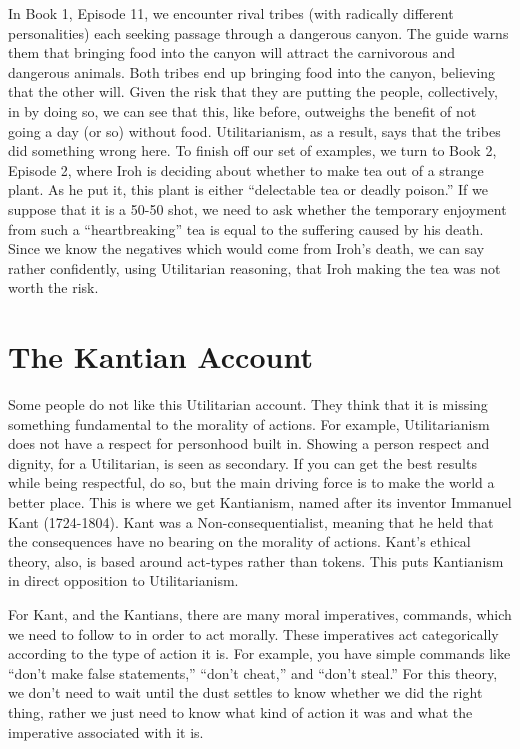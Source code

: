 In Book 1, Episode 11, we encounter rival tribes (with radically different personalities) each seeking passage through a dangerous canyon.\autocite[00:00-23:37]{Divide1} The guide warns them that bringing food into the canyon will attract the carnivorous and dangerous animals. Both tribes end up bringing food into the canyon, believing that the other will. Given the risk that they are putting the people, collectively, in by doing so, we can see that this, like before, outweighs the benefit of not going a day (or so) without food. Utilitarianism, as a result, says that the tribes did something wrong here.  To finish off our set of examples, we turn to Book 2, Episode 2, where Iroh is deciding about whether to make tea out of a strange plant.\autocite[03:14-03:53, 06:11-07:06]{Lovers1} As he put it, this plant is either “delectable tea or deadly poison.” If we suppose that it is a 50-50 shot, we need to ask whether the temporary enjoyment from such a “heartbreaking” tea is equal to the suffering caused by his death. Since we know the negatives which would come from Iroh’s death, we can say rather confidently, using Utilitarian reasoning, that Iroh making the tea was not worth the risk.

\section{The Kantian Account}

Some people do not like this Utilitarian account. They think that it is missing something fundamental to the morality of actions. For example, Utilitarianism does not have a respect for personhood built in. Showing a person respect and dignity, for a Utilitarian, is seen as secondary. If you can get the best results while being respectful, do so, but the main driving force is to make the world a better place. This is where we get Kantianism, named after its inventor Immanuel Kant (1724-1804).\autocite{Kant1} Kant was a Non-consequentialist, meaning that he held that the consequences have no bearing on the morality of actions. Kant’s ethical theory, also, is based around act-types rather than tokens. This puts Kantianism in direct opposition to Utilitarianism.

For Kant, and the Kantians, there are many moral imperatives, commands, which we need to follow to in order to act morally. These imperatives act categorically according to the type of action it is. For example, you have simple commands like “don’t make false statements,” “don’t cheat,” and “don’t steal.” For this theory, we don’t need to wait until the dust settles to know whether we did the right thing, rather we just need to know what kind of action it was and what the imperative associated with it is.

